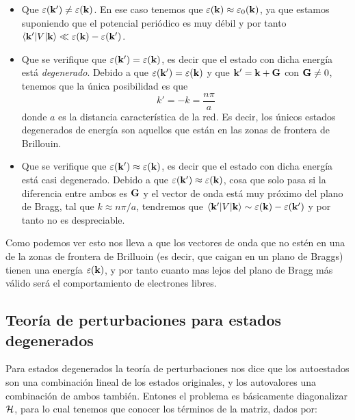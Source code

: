 \begin{itemize}
	\item Que $\varepsilon(\mathbf{k}')\neq \varepsilon(\mathbf{k})$. En ese caso tenemos que $\varepsilon(\mathbf{k}) \approx \varepsilon_0(\mathbf{k})$, ya que estamos suponiendo que el potencial periódico es muy débil y por  tanto $\langle \mathbf{k}' |V|\mathbf{k} \rangle \ll \varepsilon(\mathbf{k}) - \varepsilon(\mathbf{k}')$. 
	\item Que se verifique que $\varepsilon(\mathbf{k}')=\varepsilon(\mathbf{k})$, es decir que el estado con dicha energía está \textit{degenerado}. Debido a que $\varepsilon(\mathbf{k}')=\varepsilon(\mathbf{k})$ y que $\mathbf{k}'=\mathbf{k}+\mathbf{G}$ con $\mathbf{G}\neq 0$, tenemos que la única posibilidad es que 
	\begin{equation}
		k'=-k = \frac{n\pi}{a}
	\end{equation}
	donde $a$ es la distancia característica de la red.	Es decir, los únicos estados degenerados de energía son aquellos que están en las zonas de frontera de Brillouin.
	\item Que se verifique que $\varepsilon(\mathbf{k}')\approx\varepsilon(\mathbf{k})$, es decir que el estado con dicha energía está casi degenerado. Debido a que $\varepsilon(\mathbf{k}')\approx\varepsilon(\mathbf{k})$, cosa que solo pasa si la diferencia entre ambos es $\mathbf{G}$ y el vector de onda está muy próximo del plano de Bragg, tal que $k\approx n\pi/a$, tendremos que $\langle \mathbf{k}' |V|\mathbf{k} \rangle \sim \varepsilon(\mathbf{k}) - \varepsilon(\mathbf{k}')$ y por tanto no es despreciable.
	
\end{itemize}	

Como podemos ver esto nos lleva a que los vectores de onda que no estén en una de la zonas de frontera de Brilluoin (es decir, que caigan en un plano de Braggs) tienen una energía $\varepsilon(\mathbf{k})$, y por tanto cuanto mas lejos del plano de Bragg más válido será el comportamiento de electrones libres.

\subsection{Teoría de perturbaciones para estados degenerados}

Para estados degenerados la teoría de perturbaciones nos dice que los autoestados son una combinación lineal de los estados originales, y los autovalores una combinación de ambos también. Entones el problema es básicamente diagonalizar $\mathcal{H}$, para lo cual tenemos que conocer los términos de la matriz, dados por:

